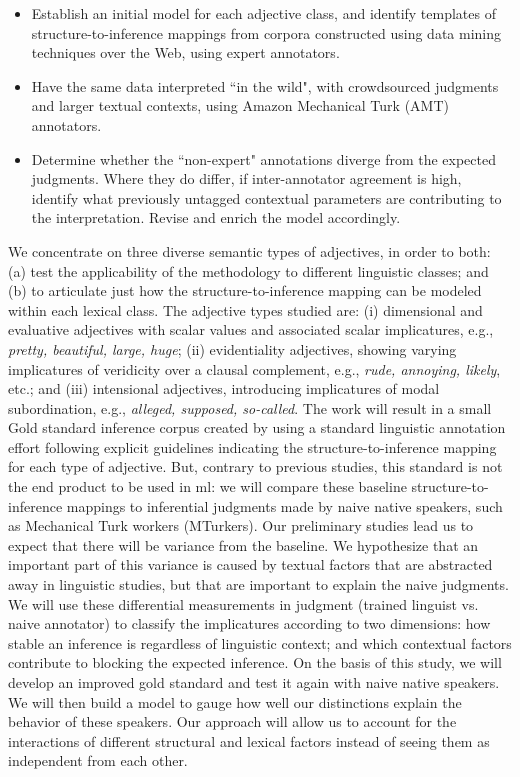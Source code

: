 \documentclass[10pt]{article}
\newcommand{\moveup}{\vspace*{-1.8mm}}
\begin{document}
\begin{itemize}

\moveup
\item Establish an initial  model for each adjective class,   and identify templates of structure-to-inference mappings from corpora constructed using data mining techniques over the Web, using expert annotators. 
\moveup
\item Have the same data interpreted  ``in the wild",  with crowdsourced judgments and  larger textual contexts, using    Amazon Mechanical Turk (AMT) annotators. 
\moveup 
\item Determine whether the ``non-expert" annotations diverge from the expected  judgments. Where they do differ, if inter-annotator agreement is high,  identify what previously untagged contextual parameters are contributing to the interpretation. Revise and enrich the model accordingly.  

\end{itemize}
\moveup

 
 
We concentrate on three diverse semantic types of adjectives, 
in order to both: (a) test the applicability of the methodology to different linguistic classes; and (b) to articulate just how the structure-to-inference mapping can be modeled within each lexical class. The adjective types studied are: 
(i) dimensional and evaluative adjectives with scalar values and associated scalar implicatures, e.g., \textit{pretty, beautiful, large, huge}; (ii) evidentiality adjectives, showing varying implicatures of veridicity over a clausal complement, e.g., \textit{rude, annoying, likely}, etc.; and (iii) intensional adjectives, introducing implicatures of modal subordination, e.g., \textit{alleged, supposed, so-called}. The work will result in a small Gold standard inference  corpus created by using a standard linguistic annotation effort following explicit guidelines indicating the structure-to-inference mapping for each type of adjective. But, contrary to previous studies, this standard is not the end product to be used in {\sc ml}: we will compare these baseline structure-to-inference mappings to inferential judgments made by naive native speakers, such as Mechanical Turk workers (MTurkers). Our preliminary studies lead us to expect that there will be variance from the baseline. We hypothesize that an important part of this variance is caused by textual factors that are abstracted away in linguistic studies, but that are important to explain the naive judgments. We will use these differential measurements in judgment (trained linguist vs. naive annotator) 
to classify the implicatures according to two dimensions: how stable an inference is regardless of linguistic context; and which contextual factors contribute to blocking the expected inference. On the basis of this study, we will develop an improved gold standard and test it again with naive native speakers. We will then build a model to gauge how well our distinctions explain the behavior of these speakers. Our approach will allow us to account for the interactions of different structural and lexical factors instead of seeing them as independent from each other. 
\end{document}
